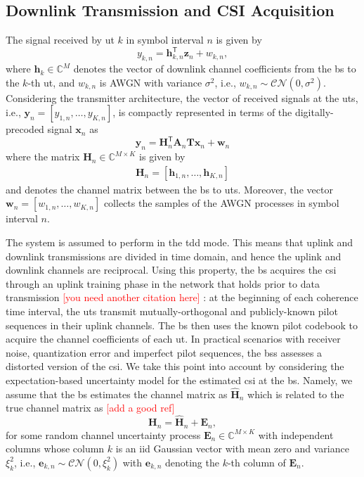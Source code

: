 \documentclass[12pt,draftclsnofoot,onecolumn,journal]{IEEEtran}
\newcommand{\cmt}[1]{\textcolor{red}{#1} }
\newcommand{\brc}[1]{ \left( #1 \right) }
\newcommand{\dbc}[1]{ \left[ #1 \right] }
\newcommand{\trp}{\mathsf{T}}
\begin{document}
\subsection{Downlink Transmission and CSI Acquisition}
The signal received by \ac{ut} $k$ in symbol interval $n$ is given by
\begin{equation}
y_{k,n} =\mathbf{h}_{k,n}^{\mathsf{T}} \mathbf{z}_n+ w_{k,n},
\end{equation}
where $\mathbf{h}_{k} \in \mathbb{C}^{M}$ denotes the vector of downlink channel coefficients from the \ac{bs} to the $k$-th \ac{ut}, and $w_{k,n}$ is \ac{AWGN} with variance $\sigma^2$, i.e., $w_{k,n}\sim\mathcal{CN} \brc{ 0, \sigma^2}$. Considering the transmitter architecture, the vector of received signals at the \acp{ut}, i.e., $\mathbf{y}_n = \dbc{y_{1,n}, \ldots, y_{K,n}}$, is compactly represented in terms of the digitally-precoded signal $\mathbf{x}_n$ as
\begin{equation}
\mathbf{y}_{n} =\mathbf{H}_n^\trp \mathbf A_n \mathbf T \mathbf{x}_n + \mathbf{w}_{n}
\end{equation}
where the matrix $\mathbf{H}_n \in \mathbb{C}^{M\times K}$ is given by
\begin{align}
	\mathbf{H}_n = \dbc{ \mathbf{h}_{1,n} , \ldots, \mathbf{h}_{K,n} }
\end{align}
and denotes the channel matrix between the \ac{bs} to \acp{ut}. Moreover, the vector $\mathbf{w}_{n} = \dbc{w_{1,n}, \ldots, w_{K,n}}$ collects the samples of the \ac{AWGN} processes in symbol interval $n$. 

The system is assumed to perform in the \ac{tdd} mode. This means that uplink and downlink transmissions are divided in time domain, and hence the uplink and downlink channels are reciprocal. Using this property, the \ac{bs} acquires the \ac{csi} through an uplink training phase in the network that holds prior to data transmission \cmt{[you need another citation here]}: at the beginning of each coherence time interval, the \acp{ut} transmit mutually-orthogonal and publicly-known pilot sequences in their uplink channels. The \ac{bs} then uses the known pilot codebook to acquire the channel coefficients of each \ac{ut}. In practical scenarios with receiver noise, quantization error and imperfect pilot sequences, the \acp{bs} assesses a distorted version of the \ac{csi}. We take this point into account by considering the expectation-based uncertainty model for the estimated \ac{csi} at the \ac{bs}. Namely, we assume that the \ac{bs} estimates the channel matrix as $\hat{\mathbf H}_n$ which is related to the true channel matrix as \cmt{[add a good ref]}
\begin{equation}
	\mathbf H_n = \hat{\mathbf H}_n + \mathbf E_n,
\end{equation}
for some random channel uncertainty process $\mathbf E_n \in\mathbb C^{M\times K}$ with independent columns whose column $k$ is an \ac{iid} Gaussian vector with mean zero and variance $\xi_k^2$, i.e., $\mathbf{e}_{k,n} \sim \mathcal{CN} \brc{ 0, \xi_k^2 }$ with $\mathbf{e}_{k,n}$ denoting the $k$-th column of $\mathbf E_n$.
\end{document}
